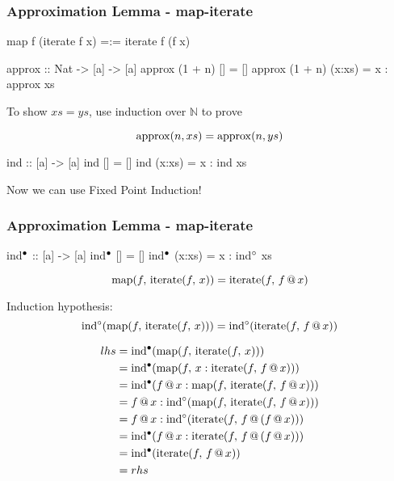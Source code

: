 \documentclass[serif,professionalfont]{beamer}
\begin{document}
\begin{frame}[fragile]
\frametitle{Approximation Lemma - map-iterate}

\pause

\begin{code}
map f (iterate f x) =:= iterate f (f x)
\end{code}

\begin{code}
approx :: Nat -> [a] -> [a]
approx (1 + n) []     = []
approx (1 + n) (x:xs) = x : approx xs
\end{code}

\pause

To show $xs = ys$, use induction over $\mathbb{N}$ to prove

$$\fa{n}\fn{approx}(n,xs) = \fn{approx}(n,ys)$$

\pause

\begin{code}
ind :: [a] -> [a]
ind []     = []
ind (x:xs) = x : ind xs
\end{code}

Now we can use Fixed Point Induction!

\end{frame}

\newcommand\iter[2]{\fn{iterate}(#1,\,#2)}
\newcommand\map[2]{\fn{map}(#1,\,#2)}
\newcommand\appw[1]{\fn{\unfix{ind}}(#1)}
\newcommand\appb[1]{\fn{\tofix{ind}}(#1)}

\begin{frame}[fragile]
\frametitle{Approximation Lemma - map-iterate}

\small{
\begin{code}[mathescape]
ind$\fixb$ :: [a] -> [a]
ind$\fixb$ []     = []
ind$\fixb$ (x:xs) = x : ind$\fixw$ xs
\end{code}
}

$$\map{f}{\iter{f}{x}} = \iter{f}{\app{f}{x}}$$

\pause

Induction hypothesis:
$$\appw{\map{f}{\iter{f}{x}}} = \appw{\iter{f}{\app{f}{x}}}$$

\pause

\begin{align*}
lhs = & \; \appb{\map{f}{\iter{f}{x}}} \\
    = & \; \appb{\map{f}{x:\iter{f}{\app{f}{x}}}}\\
    = & \; \appb{\app{f}{x} : \map{f}{\iter{f}{\app{f}{x}}}}\\
    = & \; \app{f}{x} : \appw{\map{f}{\iter{f}{\app{f}{x}}}}\\
    = & \; \app{f}{x} : \appw{\iter{f}{\app{f}{(\app{f}{x})}}}\\
    = & \; \appb{\app{f}{x} : \iter{f}{\app{f}{(\app{f}{x})}}}\\
    = & \; \appb{\iter{f}{\app{f}{x}}} \\
    = & \; rhs
\end{align*}

\end{frame}
\end{document}
